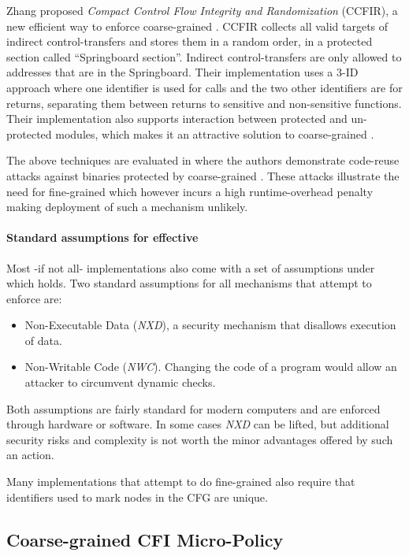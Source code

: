 Zhang \ETAL \cite{Zhang2013} proposed \emph{Compact Control Flow Integrity
and Randomization} (CCFIR), a new efficient way to enforce coarse-grained \CFI.
CCFIR collects all valid targets of indirect control-transfers and stores them
in a random order, in a protected section called ``Springboard section''.
Indirect control-transfers are only allowed to addresses that are in the
Springboard. Their implementation uses a 3-ID approach where one identifier is
used for calls and the two other identifiers are for returns, separating them
between returns to sensitive and non-sensitive functions. Their implementation
also supports interaction between protected and un-protected modules, which
makes it an attractive solution to coarse-grained \CFI.

The above techniques are evaluated in \cite{outofcontrol_ieeesp2014} where
the authors demonstrate code-reuse attacks against binaries protected by
coarse-grained \CFI. These attacks illustrate the need for fine-grained
\CFI which however incurs a high runtime-overhead penalty making deployment
of such a mechanism unlikely.

\paragraph{Standard assumptions for effective \CFI}\label{sec:cfi_assumptions}

Most -if not all- \CFI implementations also come with a set of assumptions under
which \CFI holds. Two standard assumptions for all mechanisms that attempt to
enforce \CFI are:
\begin{itemize}
\item Non-Executable Data (\emph{NXD}), a security
mechanism that disallows execution of data.
\item Non-Writable Code (\emph{NWC}). Changing the code of a
program would allow an attacker to circumvent dynamic checks.
\end{itemize}

Both assumptions are fairly standard for modern computers and are enforced
through hardware or software. In some cases \emph{NXD} can be lifted, but
additional security risks and complexity is not worth the minor advantages
offered by such an action.

Many implementations that attempt to do fine-grained \CFI also require that
identifiers used to mark nodes in the CFG are unique.

\subsection{Coarse-grained CFI Micro-Policy}\label{sec:cfi_coarse}

